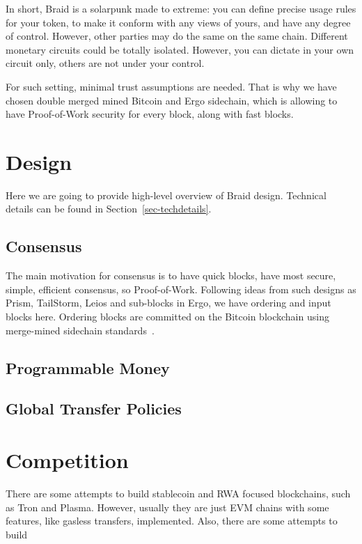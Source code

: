 \documentclass{llncs}   %
\newcommand{\bc}{Braid}
\begin{document}
In short, \bc{} is a solarpunk made to extreme: you can define precise usage rules for your token, to make it conform with any views of yours, and have any degree of control. However, other parties may do the same on the same chain. Different monetary circuits could be totally isolated. However, you can dictate in your own circuit only, others are not under your control.

For such setting, minimal trust assumptions are needed. That is why we have chosen double merged mined Bitcoin and Ergo sidechain, which is allowing to have Proof-of-Work security for every block, along with fast blocks. 


\section{Design}
\label{sec-design}

Here we are going to provide high-level overview of \bc{} design. Technical details can be found in Section~\ref{sec-techdetails}. 


\subsection{Consensus}

The main motivation for consensus is to have quick blocks, have most secure, simple, efficient consensus, so Proof-of-Work. Following ideas from such designs as Prism, TailStorm, Leios and sub-blocks in Ergo, we have ordering and input blocks here. Ordering blocks are committed on the Bitcoin blockchain using merge-mined sidechain standards~\cite{bitcoinmm}.

\subsection{Programmable Money}
\subsection{Global Transfer Policies}


\section{Competition}
\label{sec-competition}


There are some attempts to build stablecoin and RWA focused blockchains, such as Tron and Plasma. However, usually they are just EVM chains with some features, like gasless transfers, implemented. Also, there are some attempts to build 
\end{document}
